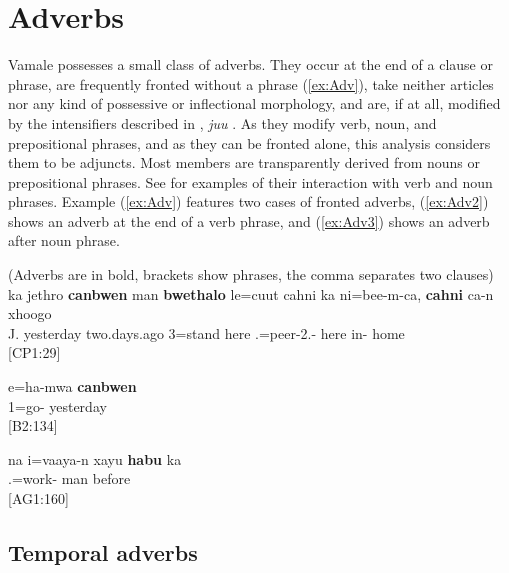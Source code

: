 \section{Adverbs}
\label{sec:WCAdverbs}
Vamale possesses a small class of adverbs. They occur at the end of a clause or phrase, are frequently fronted without a phrase (\ref{ex:Adv}), take neither articles nor any kind of possessive or inflectional morphology, and are, if at all, modified by the intensifiers described in , \textit{juu} . As they modify verb, noun, and prepositional phrases, and as they can be fronted alone, this analysis considers them to be adjuncts. Most members are transparently derived from nouns or prepositional phrases. See  for examples of their interaction with verb and noun phrases. Example (\ref{ex:Adv}) features two cases of fronted adverbs,  (\ref{ex:Adv2}) shows an adverb at the end of a verb phrase, and (\ref{ex:Adv3}) shows an adverb after noun phrase.\largerpage[-2]

\ea
\label{ex:Adv}
(Adverbs are in bold, brackets show phrases, the comma separates two clauses)\\
\gll ka {\ob}jethro{\cb} \textbf{canbwen} man \textbf{bwethalo} {\ob}le=cuut cahni ka ni=bee-m-ca{\cb}, \textbf{cahni} {\ob}ca-n xhoogo{\cb}\\
  J. yesterday  two.days.ago 3=stand here  .=peer-2.- here in- home\\
\glt {} {[CP1:29]}
\z


\ea\label{ex:Adv2}
\gll e=ha-mwa \textbf{canbwen}\\
 1=go- yesterday\\
\glt {} {[B2:134]}
\z


\ea\label{ex:Adv3}
\gll na i=vaaya-n xayu \textbf{habu} ka\\
  .=work- man before \\
\glt {} {[AG1:160]}\\
\z

\subsection{Temporal adverbs}
\label{ssec:TempAdv}

